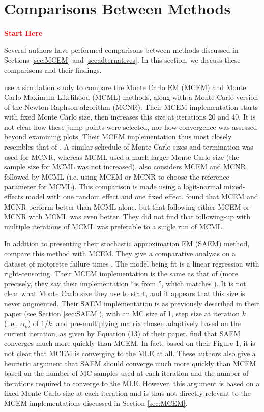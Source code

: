 \documentclass[11pt, oneside]{article}   	%
\begin{document}
\section{Comparisons Between Methods}
\label{sec:comparison}

{\Huge \textbf{\textcolor{red}{Start Here}}}

Several authors have performed comparisons between methods discussed in Sections \ref{sec:MCEM} and \ref{sec:alternatives}. In this section, we discuss these comparisons and their findings.

\citet{McC97} use a simulation study to compare the Monte Carlo EM (MCEM) and Monte Carlo Maximum Likelihood (MCML) methods, along with a Monte Carlo version of the Newton-Raphson algorithm (MCNR). Their MCEM implementation starts with fixed Monte Carlo size, then increases this size at iterations 20 and 40. It is not clear how these jump points were selected, nor how convergence was assessed beyond examining plots. Their MCEM implementation thus most closely resembles that of \citet{Wei90}. A similar schedule of Monte Carlo sizes and termination was used for MCNR, whereas MCML used a much larger Monte Carlo size (the sample size for MCML was not increased). \citeauthor{McC97} also considers MCEM and MCNR followed by MCML (i.e. using MCEM or MCNR to choose the reference parameter for MCML). This comparison is made using a logit-normal mixed-effects model with one random effect and one fixed effect. \citeauthor{McC97} found that MCEM and MCNR perform better than MCML alone, but that following either MCEM or MCNR with MCML was even better. They did not find that following-up with multiple iterations of MCML was preferable to a single run of MCML.

In addition to presenting their stochastic approximation EM (SAEM) method, \citet{Gu98I} compare this method with MCEM. They give a comparative analysis on a dataset of motorette failure times \citep[see][for a diagram and explanation of what a motorette is]{Rai16}. The model being fit is a linear regression with right-censoring. Their MCEM implementation is the same as that of \citet{Wei90} (more precisely, they say their implementation ``is from \citet{Tan93}'', which matches \citeauthor{Wei90}). It is not clear what Monte Carlo size they use to start, and it appears that this size is never augmented. Their SAEM implementation is as previously described in their paper (see Section \ref{sec:SAEM}), with an MC size of 1, step size at iteration $k$ (i.e., $\alpha_k$) of $1/k$, and pre-multiplying matrix chosen adaptively based on the current iteration, as given by Equation (13) of their paper. \citeauthor{Gu98I} find that SAEM converges much more quickly than MCEM. In fact, based on their Figure 1, it is not clear that MCEM is converging to the MLE at all. These authors also give a heuristic argument that SAEM should converge much more quickly than MCEM based on the number of MC samples used at each iteration and the number of iterations required to converge to the MLE. However, this argument is based on a fixed Monte Carlo size at each iteration and is thus not directly relevant to the MCEM implementations discussed in Section \ref{sec:MCEM}.
\end{document}
